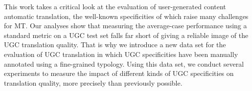 This work takes a critical look at the evaluation of user-generated content automatic translation, the well-known specificities of which raise many challenges for MT. Our analyses show that measuring the average-case performance using a standard metric on a UGC test set falls far short of giving a reliable image of the UGC translation quality. That is why we introduce a new data set for the evaluation of UGC translation in which UGC specificities have been manually annotated using a fine-grained typology. Using this data set, we conduct several experiments to measure the impact of different kinds of UGC specificities on translation quality, more precisely than previously possible.
